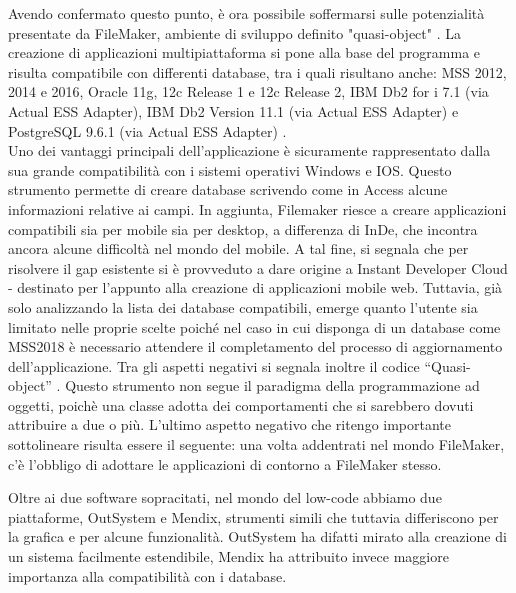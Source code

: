 Avendo confermato questo punto, è ora possibile soffermarsi sulle potenzialità presentate da FileMaker, ambiente di sviluppo definito "quasi-object" \hyperref[bib21]{\cite{[21]}}. 
La creazione di applicazioni multipiattaforma si pone alla base del programma e risulta compatibile con differenti database, tra i quali risultano anche: MSS 2012, 2014 e 2016, 
Oracle 11g, 12c Release 1 e 12c Release 2, IBM Db2 for i 7.1 (via Actual ESS Adapter), IBM Db2 Version 11.1 (via Actual ESS Adapter) e PostgreSQL 9.6.1 (via Actual ESS Adapter) \hyperref[bib24]{\cite{[24]}}.\\
Uno dei vantaggi principali dell'applicazione è sicuramente rappresentato dalla sua grande compatibilità con i sistemi operativi Windows e IOS. 
Questo strumento permette di creare database scrivendo come in Access alcune informazioni relative ai campi. In aggiunta, Filemaker riesce a creare applicazioni compatibili sia per mobile sia per desktop, a differenza di InDe, che incontra ancora alcune difficoltà nel mondo del mobile.
A tal fine, si segnala che per risolvere il gap esistente si è provveduto a dare origine a Instant Developer Cloud - destinato per l'appunto alla creazione di applicazioni mobile web.
Tuttavia, già solo analizzando la lista dei database compatibili, emerge quanto l'utente sia limitato nelle proprie scelte poiché nel caso in cui disponga di un database come MSS2018 è necessario attendere il completamento del processo di aggiornamento dell'applicazione. 
Tra gli aspetti negativi si segnala inoltre il codice “Quasi-object” . Questo strumento non segue il paradigma della programmazione ad oggetti, poichè una classe adotta dei comportamenti che si sarebbero dovuti attribuire a due o più.
L'ultimo aspetto negativo che ritengo importante sottolineare risulta essere il seguente: una volta addentrati nel mondo FileMaker, c'è l'obbligo di adottare le applicazioni di contorno a FileMaker stesso. 


Oltre ai due software sopracitati, nel mondo del low-code abbiamo due piattaforme, OutSystem e Mendix, strumenti simili che tuttavia differiscono per la grafica e per alcune funzionalità. 
OutSystem ha difatti mirato alla creazione di un sistema facilmente estendibile, Mendix ha attribuito invece maggiore importanza alla compatibilità con i database.

